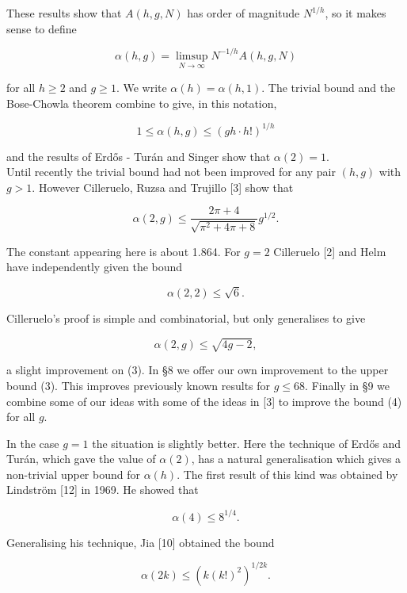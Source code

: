 \documentclass[10pt]{article}
\begin{document}
These results show that $A(h, g, N)$ has order of magnitude $N^{1 / h}$, so it makes sense to define

$$
\alpha(h, g)=\limsup _{N \rightarrow \infty} N^{-1 / h} A(h, g, N)
$$

for all $h \geq 2$ and $g \geq 1$. We write $\alpha(h)=\alpha(h, 1)$. The trivial bound and the Bose-Chowla theorem combine to give, in this notation,

$$
1 \leq \alpha(h, g) \leq(g h \cdot h!)^{1 / h}
$$

and the results of Erdős - Turán and Singer show that $\alpha(2)=1$.\\
Until recently the trivial bound had not been improved for any pair $(h, g)$ with $g>1$. However Cilleruelo, Ruzsa and Trujillo [3] show that


\begin{equation*}
\alpha(2, g) \leq \frac{2 \pi+4}{\sqrt{\pi^{2}+4 \pi+8}} g^{1 / 2} . \tag{4}
\end{equation*}


The constant appearing here is about 1.864. For $g=2$ Cilleruelo [2] and Helm have independently given the bound


\begin{equation*}
\alpha(2,2) \leq \sqrt{6} . \tag{5}
\end{equation*}


Cilleruelo's proof is simple and combinatorial, but only generalises to give

$$
\alpha(2, g) \leq \sqrt{4 g-2},
$$

a slight improvement on (3). In §8 we offer our own improvement to the upper bound (3). This improves previously known results for $g \leq 68$. Finally in §9 we combine some of our ideas with some of the ideas in [3] to improve the bound (4) for all $g$.

In the case $g=1$ the situation is slightly better. Here the technique of Erdős and Turán, which gave the value of $\alpha(2)$, has a natural generalisation which gives a non-trivial upper bound for $\alpha(h)$. The first result of this kind was obtained by Lindström [12] in 1969. He showed that


\begin{equation*}
\alpha(4) \leq 8^{1 / 4} . \tag{6}
\end{equation*}


Generalising his technique, Jia [10] obtained the bound


\begin{equation*}
\alpha(2 k) \leq\left(k(k!)^{2}\right)^{1 / 2 k} . \tag{7}
\end{equation*}
\end{document}
